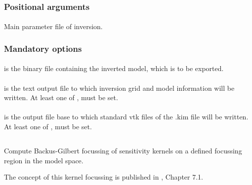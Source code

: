 \subsubsection{Positional arguments}
\paragraph{}
Main parameter file of inversion.
\subsubsection{Mandatory options}
\paragraph{}
 is the binary file containing the inverted model, which is to be exported.
\paragraph{}
 is the text output file to which inversion grid and model information will be written. 
At least one of ,   must be set.
\paragraph{}
 is the output file base to which standard vtk files of the .kim file will be written.
At least one of ,   must be set.
%
%
\subsection{} \label{programs_scripts,sec:bin_prog,sec:focus_spec_kernel}
Compute Backus-Gilbert focussing of sensitivity kernels on a defined focussing region in the model space. 

The concept of this kernel focussing is published in \cite{_743d334d-dfa4-4a16-8cc5-91cdadc95271}, Chapter 7.1. 

